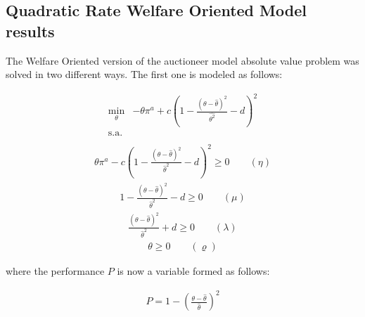 \documentclass[a4paper,fleqn]{cas-dc}
\begin{document}
\subsection{Quadratic Rate Welfare Oriented Model results}\label{subsec:resultsQR}

The Welfare Oriented version of the auctioneer model absolute value problem was solved in two different ways. The first one is modeled as follows:

\begin{equation}
\begin{array}{rrclcl}
\displaystyle \min_{\theta} & -\theta \pi^a + c(1-\frac{(\theta - \hat{\theta})^2}{\hat{\theta^2}}-d)^2 \\\textrm{s.a.} \label{fo:social1}\\
\end{array}
\end{equation}
\begin{equation}
\begin{array}{rrclcl}
\displaystyle \theta \pi^a - c(1-\frac{(\theta - \hat{\theta})^2}{\hat{\theta}^2}-d)^2 \geq 0 \qquad (\eta)\label{social1:r11}
\end{array}
\end{equation}
\begin{equation}
\begin{array}{rrclcl}
1 - \frac{(\theta-\hat{\theta})^2}{\hat{\theta}^2} - d \geq 0 \qquad (\mu) \label{social1:r31}
\end{array}
\end{equation}
\begin{equation}
\begin{array}{rrclcl}
\frac{(\theta-\hat{\theta})^2}{\hat{\theta}^2 }+ d \geq 0 \qquad (\lambda)\label{social1:r41}
\end{array}
\end{equation}
\begin{equation}
\begin{array}{rrclcl}
\theta \geq 0 \qquad (\varrho)\label{social1:r21}
\end{array}
\end{equation}

where the performance $P$ is now a variable formed as follows:

\begin{equation}
\begin{array}{rrclcl}
\displaystyle P = 1- (\frac{{\theta - \hat{\theta}}}{\hat{\theta}})^2 \\
\end{array}
\end{equation}
\end{document}

